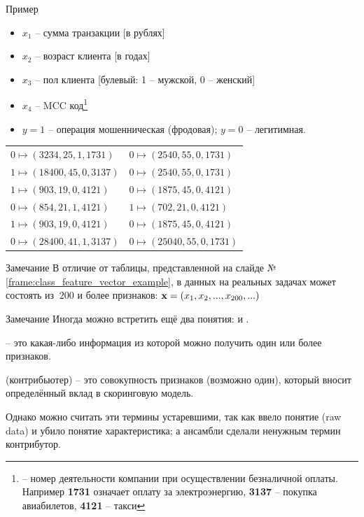   \begin{frame}{Пример}\label{frame:class_feature_vector_example}
  \begin{itemize}
  	 \item $x_1$ -- сумма транзакции [в рублях]
  	 \item $x_2$ -- возраст клиента [в годах]
  	 \item $x_3$ -- пол клиента [булевый: 1 -- мужской, 0 -- женский]
  	 \item $x_4$ -- MCC код\footnote{ -- номер деятельности компании при осуществлении безналичной оплаты. Например \textbf{1731} означает оплату за электроэнергию, \textbf{3137} -- покупка авиабилетов, \textbf{4121} -- такси}
  	 \item  $y=1$ -- операция мошенническая (фродовая);  $y=0$ -- легитимная.
  \end{itemize}
  \begin{center}\small \begin{tabular}{ l l }
  	$0 \mapsto (3234, 25, 1, 1731) $ &  $0 \mapsto (2540, 55, 0, 1731)$ \\
  	$1 \mapsto (18400, 45, 0, 3137)$ & $0 \mapsto (2540, 55, 0, 1731)$  \\
  	$1 \mapsto (903, 19, 0, 4121)$  & $0 \mapsto (1875, 45, 0, 4121)$  \\
  	$0 \mapsto (854, 21, 1, 4121)$  & $1 \mapsto (702, 21, 0, 4121)$  \\
  	$1 \mapsto (903, 19, 0, 4121)$  & $0 \mapsto (1875, 45, 0, 4121)$  \\
  	$0 \mapsto (28400, 41, 1, 3137)$ & $0 \mapsto (25040, 55, 0, 1731)$  \\
  \end{tabular}\end{center}
  \end{frame}
  
  \begin{frame}
   \begin{block}{Замечание}
	  В отличие от таблицы, представленной на слайде №\ref{frame:class_feature_vector_example},
	  в данных на реальных задачах  может состоять из $~200$ и более признаков:
	  $\bold x = (x_1, x_2, ..., x_{200}, ...)$
  \end{block}
   \end{frame}

  \begin{frame}
\begin{block}{Замечание}
	Иногда можно встретить ещё два понятия:  и .
	
	 -- это какая-либо информация из которой можно получить один
	или более признаков.
	
	 (контрибьютер) -- это совокупность признаков (возможно один),
	который вносит определённый вклад в скоринговую модель. 
	
	Однако можно считать эти термины устаревшими, так как
	 ввело понятие  (raw data)
	и убило понятие характеристика; 
	а ансамбли сделали ненужным термин контрибутор.
\end{block}
\end{frame}

